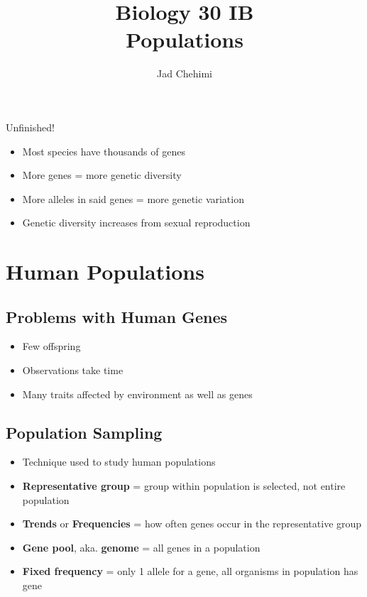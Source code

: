 \documentclass[a4paper,12pt]{article}
\title{Biology 30 IB \\ Populations}
\author{Jad Chehimi}
\begin{document}
\maketitle

\begin{center}
\Huge
Unfinished!
\normalsize
\end{center}

\tableofcontents

\pagebreak

\begin{itemize}
    \item{Most species have thousands of genes}
    \item{More genes = more genetic diversity}
    \item{More alleles in said genes = more genetic variation}
    \item{Genetic diversity increases from sexual reproduction}
\end{itemize}

\section{Human Populations}
\subsection{Problems with Human Genes}
\begin{itemize}
    \item{Few offspring}
    \item{Observations take time}
    \item{Many traits affected by environment as well as genes}
\end{itemize}

\subsection{Population Sampling}
\begin{itemize}
    \item{Technique used to study human populations}
    \item{\textbf{Representative group} = group within population is selected, not entire population}
    \item{\textbf{Trends} or \textbf{Frequencies} = how often genes occur in the representative group}
    \item{\textbf{Gene pool}, aka. \textbf{genome} = all genes in a population}
    \item{\textbf{Fixed frequency} = only 1 allele for a gene, all organisms in population has gene}
\end{itemize}
\end{document}

